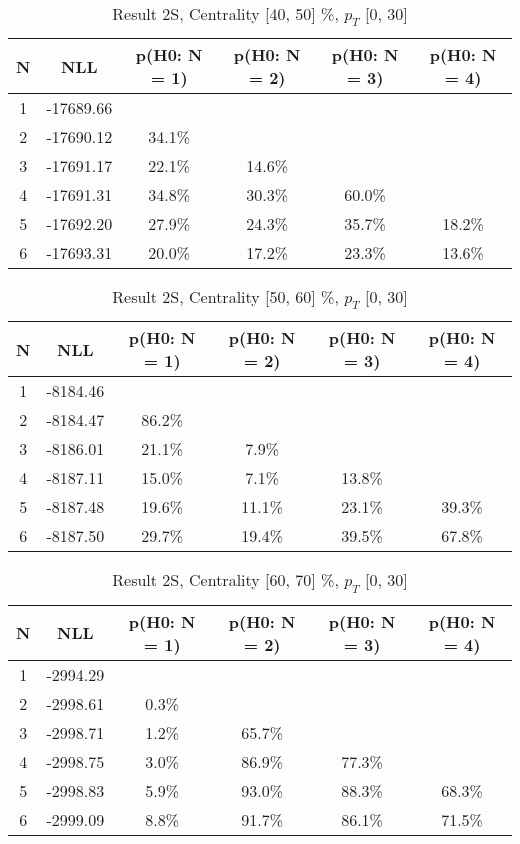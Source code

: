 \begin{table}[htb]
	\begin{center}
	\caption{Result 2S, Centrality [40, 50] \%, $p_{T}$ [0, 30] \GeV
}
{\footnotesize\renewcommand{\arraystretch}{1.4}
		\begin{tabular}{cc||cccc}
			N & NLL & p(H0: N = 1) & p(H0: N = 2) & p(H0: N = 3) & p(H0: N = 4)\\ 
		\hline
1 & -17689.66 & & & & \\
2 & -17690.12 & 34.1\% & & & \\
3 & -17691.17 & 22.1\% & 14.6\% & & \\
4 & -17691.31 & 34.8\% & 30.3\% & 60.0\% & \\
5 & -17692.20 & 27.9\% & 24.3\% & 35.7\% & 18.2\% \\
6 & -17693.31 & 20.0\% & 17.2\% & 23.3\% & 13.6\% \\
	\end{tabular}
		\label{tab:lab}
	}
	\end{center}\end{table}

\begin{table}[htb]
	\begin{center}
	\caption{Result 2S, Centrality [50, 60] \%, $p_{T}$ [0, 30] \GeV
}
{\footnotesize\renewcommand{\arraystretch}{1.4}
		\begin{tabular}{cc||cccc}
			N & NLL & p(H0: N = 1) & p(H0: N = 2) & p(H0: N = 3) & p(H0: N = 4)\\ 
		\hline
1 & -8184.46 & & & & \\
2 & -8184.47 & 86.2\% & & & \\
3 & -8186.01 & 21.1\% & 7.9\% & & \\
4 & -8187.11 & 15.0\% & 7.1\% & 13.8\% & \\
5 & -8187.48 & 19.6\% & 11.1\% & 23.1\% & 39.3\% \\
6 & -8187.50 & 29.7\% & 19.4\% & 39.5\% & 67.8\% \\
	\end{tabular}
		\label{tab:lab}
	}
	\end{center}\end{table}

\begin{table}[htb]
	\begin{center}
	\caption{Result 2S, Centrality [60, 70] \%, $p_{T}$ [0, 30] \GeV
}
{\footnotesize\renewcommand{\arraystretch}{1.4}
		\begin{tabular}{cc||cccc}
			N & NLL & p(H0: N = 1) & p(H0: N = 2) & p(H0: N = 3) & p(H0: N = 4)\\ 
		\hline
1 & -2994.29 & & & & \\
2 & -2998.61 & 0.3\% & & & \\
3 & -2998.71 & 1.2\% & 65.7\% & & \\
4 & -2998.75 & 3.0\% & 86.9\% & 77.3\% & \\
5 & -2998.83 & 5.9\% & 93.0\% & 88.3\% & 68.3\% \\
6 & -2999.09 & 8.8\% & 91.7\% & 86.1\% & 71.5\% \\
	\end{tabular}
		\label{tab:lab}
	}
	\end{center}\end{table}

